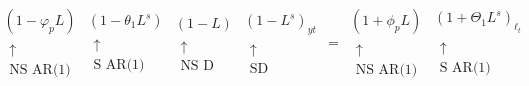 \documentclass[12pt,]{article}
\begin{document}
\begin{equation}
\begin{matrix}
   \left( 1-{{\varphi }_{p}}L \right)  \\
   \begin{matrix}
   \uparrow   \\
   \text{NS AR(1)}  \\
\end{matrix}  \\
\end{matrix}\begin{matrix}
   \left( 1-{{\theta }_{1}}{{L}^{s}} \right)  \\
   \begin{matrix}
   \uparrow   \\
   \text{S AR(1)}  \\
\end{matrix}  \\
\end{matrix}\begin{matrix}
   \left( 1-L \right)  \\
   \begin{matrix}
   \uparrow   \\
   \text{NS D}  \\
\end{matrix}  \\
\end{matrix}\begin{matrix}
   {{\left( 1-{{L}^{s}} \right)}_{yt}}  \\
   \begin{matrix}
   \uparrow   \\
   \text{SD}  \\
\end{matrix}  \\
\end{matrix}\begin{matrix}
   =  \\
   {}  \\
\end{matrix}\begin{matrix}
   \left( 1+{{\phi }_{p}}L \right)  \\
   \begin{matrix}
   \uparrow   \\
   \text{NS AR(1)}  \\
\end{matrix}  \\
\end{matrix}\begin{matrix}
   {{\left( 1+{{\Theta }_{1}}{{L}^{s}} \right)}_{{{\ell }_{t}}}}  \\
   \begin{matrix}
   \uparrow   \\
   \text{S AR(1)}  \\
\end{matrix}  \\
\end{matrix}
\label{eq:sarima}
\end{equation}
\end{document}
